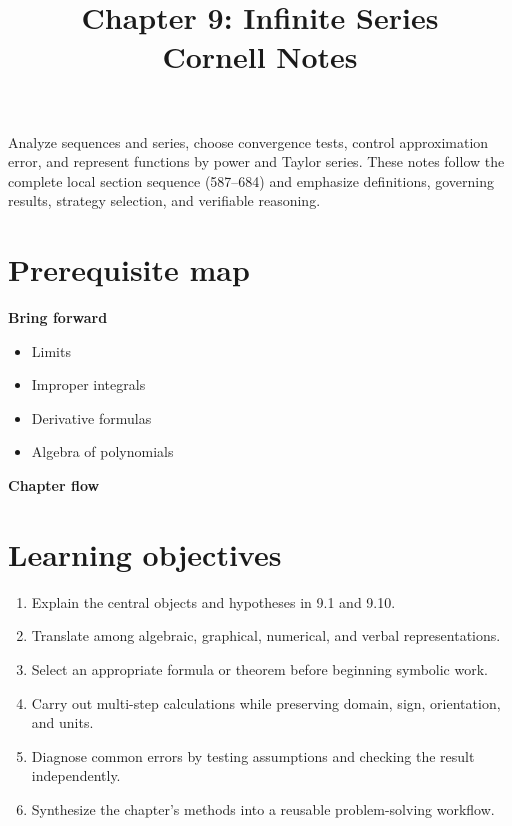 \documentclass[11pt]{article}
\title{Chapter 9: Infinite Series\\[2mm]\large Cornell Notes}
\author{}
\date{}
\begin{document}
\maketitle
\thispagestyle{fancy}
\begin{orientationbox}
Analyze sequences and series, choose convergence tests, control approximation error, and represent functions by power and Taylor series. These notes follow the complete local section sequence (587--684) and emphasize definitions, governing results, strategy selection, and verifiable reasoning.
\end{orientationbox}

\section{Prerequisite map}
\begin{minipage}[t]{0.42\textwidth}
\textbf{Bring forward}
\begin{itemize}
\item Limits
\item Improper integrals
\item Derivative formulas
\item Algebra of polynomials
\end{itemize}
\end{minipage}\hfill
\begin{minipage}[t]{0.54\textwidth}
\textbf{Chapter flow}
\begin{center}
\end{center}
\end{minipage}

\section{Learning objectives}
\begin{enumerate}
\item Explain the central objects and hypotheses in 9.1 and 9.10.
\item Translate among algebraic, graphical, numerical, and verbal representations.
\item Select an appropriate formula or theorem before beginning symbolic work.
\item Carry out multi-step calculations while preserving domain, sign, orientation, and units.
\item Diagnose common errors by testing assumptions and checking the result independently.
\item Synthesize the chapter's methods into a reusable problem-solving workflow.
\end{enumerate}
\end{document}
